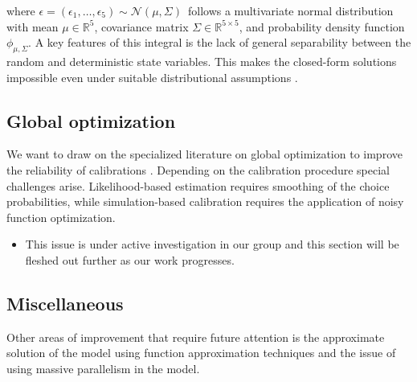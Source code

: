 \noindent where $\epsilon = (\epsilon_1, \dots, \epsilon_5) \sim \mathcal{N}(\mu, \Sigma)\,$ follows a multivariate normal distribution with mean $\mu \in \mathbb{R}^{5}$, covariance matrix $ \Sigma \in \mathbb{R}^{5 \times 5}$, and probability density function $\phi_{\mu, \Sigma}$. A key features of this integral is the lack of general separability between the random and deterministic state variables. This makes the closed-form solutions impossible even under suitable distributional assumptions \citep{McFadden.1978,Rust.1987}.
\subsection{Global optimization} We want to draw on the specialized literature on global optimization to improve the reliability of calibrations \citep{Locatelli.2013}. Depending on the calibration procedure special challenges arise. Likelihood-based estimation requires smoothing of the choice probabilities, while simulation-based calibration requires the application of noisy function optimization.

\begin{itemize}
  \item This issue is under active investigation in our group and this section will be fleshed out further as our work progresses.
\end{itemize}
\subsection{Miscellaneous} Other areas of improvement that require future attention is the approximate solution of the model using function approximation techniques and the issue of using massive parallelism in the model.
